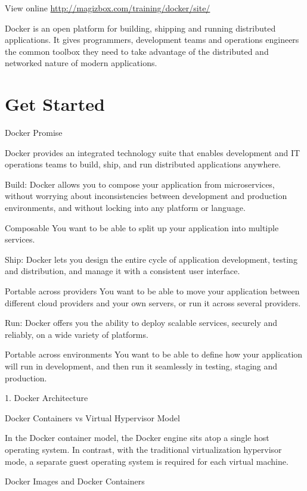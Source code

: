 View online \href{http://magizbox.com/training/docker/site/}{http://magizbox.com/training/docker/site/}

Docker is an open platform for building, shipping and running distributed applications. It gives programmers, development teams and operations engineers the common toolbox they need to take advantage of the distributed and networked nature of modern applications.

\section{Get Started}

Docker Promise

Docker provides an integrated technology suite that enables development and IT operations teams to build, ship, and run distributed applications anywhere.



Build: Docker allows you to compose your application from microservices, without worrying about inconsistencies between development and production environments, and without locking into any platform or language.

Composable You want to be able to split up your application into multiple services.

Ship: Docker lets you design the entire cycle of application development, testing and distribution, and manage it with a consistent user interface.

Portable across providers You want to be able to move your application between different cloud providers and your own servers, or run it across several providers.

Run: Docker offers you the ability to deploy scalable services, securely and reliably, on a wide variety of platforms.

Portable across environments You want to be able to define how your application will run in development, and then run it seamlessly in testing, staging and production.

1. Docker Architecture


Docker Containers vs Virtual Hypervisor Model



In the Docker container model, the Docker engine sits atop a single host operating system. In contrast, with the traditional virtualization hypervisor mode, a separate guest operating system is required for each virtual machine.

Docker Images and Docker Containers



